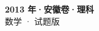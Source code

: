 \documentclass[zihao=-4, a4paper]{ctexart}
\begin{document}
\begin{center}
  {\Large\bfseries 2013 年·安徽卷·理科}\\[4pt]
  {\large 数学 · 试题版}
\end{center}
\medskip
{}

\end{document}
